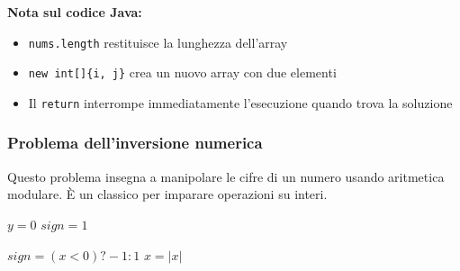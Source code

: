 \documentclass[a4paper, 11pt]{article}
\theoremstyle{definition}
\theoremstyle{remark}
\theoremstyle{remark}
\newenvironment{nota}{%
	\begin{tcolorbox}[
		colback=codebg,
		colframe=primary,
		fonttitle=\bfseries,
		title=Nota,
		left=6pt, right=6pt, top=4pt, bottom=4pt
		]
	}{%
	\end{tcolorbox}
}
\begin{document}
	\begin{nota}
		\textbf{Nota sul codice Java:}
		\begin{itemize}
			\item \texttt{nums.length} restituisce la lunghezza dell'array
			\item \texttt{new int[]\{i, j\}} crea un nuovo array con due elementi
			\item Il \texttt{return} interrompe immediatamente l'esecuzione quando trova la soluzione
		\end{itemize}
	\end{nota}
	
	\subsubsection*{Problema dell'inversione numerica}
	
	\begin{softnote}
		Questo problema insegna a manipolare le cifre di un numero usando aritmetica modulare. È un classico per imparare operazioni su interi.
	\end{softnote}
	
	\begin{algorithm}[H]
		\caption{Inversione numerica}
		\label{alg:inversione}
		
		
		$y = 0$
		$sign = 1$
		
		$sign = (x < 0) ? -1 : 1$
		$x = |x|$
		
		
	\end{algorithm}
	
\end{document}
